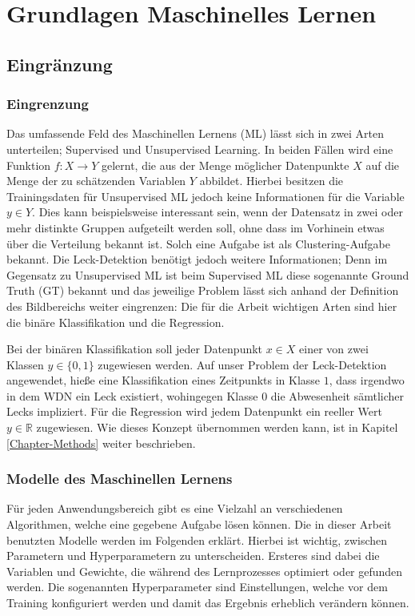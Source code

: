 \chapter{Grundlagen Maschinelles Lernen \label{Chapter-ML}}

\section{Eingränzung}

\subsection*{Eingrenzung}

Das umfassende Feld des Maschinellen Lernens (ML) lässt sich in zwei Arten unterteilen;
 Supervised und Unsupervised Learning. In beiden Fällen wird eine Funktion $f: X \rightarrow Y$ gelernt,
 die aus der Menge möglicher Datenpunkte $X$ auf die Menge der zu schätzenden Variablen $Y$ abbildet.
 Hierbei besitzen die Trainingsdaten für Unsupervised ML jedoch keine Informationen für die
 Variable $y \in Y$. Dies kann beispielsweise interessant sein, wenn der Datensatz in zwei oder mehr distinkte
 Gruppen aufgeteilt werden soll, ohne dass im Vorhinein etwas über die Verteilung bekannt ist. Solch eine
 Aufgabe ist als Clustering-Aufgabe bekannt. Die Leck-Detektion benötigt jedoch weitere Informationen;
 Denn im Gegensatz zu Unsupervised ML ist beim Supervised ML diese sogenannte Ground Truth (GT) bekannt und
 das jeweilige Problem lässt sich anhand der Definition des Bildbereichs weiter eingrenzen: Die für die
 Arbeit wichtigen Arten sind hier die binäre Klassifikation und die Regression.

Bei der binären Klassifikation soll jeder Datenpunkt $x \in X$ einer von zwei Klassen $y \in \{0, 1\}$ zugewiesen
 werden. Auf unser Problem der Leck-Detektion angewendet, hieße eine Klassifikation eines Zeitpunkts in
 Klasse $1$, dass irgendwo in dem WDN ein Leck existiert, wohingegen Klasse $0$ die Abwesenheit sämtlicher
 Lecks impliziert. Für die Regression wird jedem Datenpunkt ein reeller Wert $y \in \mathbb{R}$ zugewiesen.
 Wie dieses Konzept übernommen werden kann, ist in Kapitel \ref{Chapter-Methods} weiter beschrieben. 


\subsection*{Modelle des Maschinellen Lernens}

Für jeden Anwendungsbereich gibt es eine Vielzahl an verschiedenen Algorithmen, welche eine gegebene Aufgabe
 lösen können. Die in dieser Arbeit benutzten Modelle werden im Folgenden erklärt. Hierbei ist wichtig, zwischen
 Parametern und Hyperparametern zu unterscheiden. Ersteres sind dabei die Variablen und Gewichte, die während
 des Lernprozesses optimiert oder gefunden werden. Die sogenannten Hyperparameter sind Einstellungen, welche
 vor dem Training konfiguriert werden und damit das Ergebnis erheblich verändern können.

